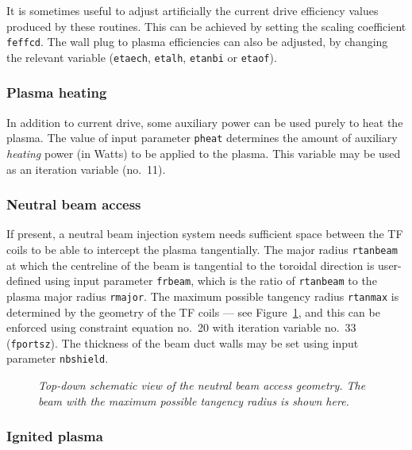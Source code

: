 \documentclass[11pt,a4paper]{report}
\begin{document}
It is sometimes useful to adjust artificially the current drive efficiency
values produced by these routines. This can be achieved by setting the scaling
coefficient \texttt{feffcd}. The wall plug to plasma efficiencies can also be
adjusted, by changing the relevant variable (\texttt{etaech}, \texttt{etalh},
\texttt{etanbi} or \texttt{etaof}).

\subsubsection{Plasma heating}

In addition to current drive, some auxiliary power can be used purely to heat
the plasma. The value of input parameter \texttt{pheat} determines the amount
of auxiliary \textit{heating}\/ power (in Watts) to be applied to the
plasma. This variable may be used as an iteration variable (no.\ 11).

\subsubsection{Neutral beam access}

If present, a neutral beam injection system needs sufficient space between the
TF coils to be able to intercept the plasma tangentially. The major radius
\texttt{rtanbeam} at which the centreline of the beam is tangential to the
toroidal direction is user-defined using input parameter \texttt{frbeam},
which is the ratio of \texttt{rtanbeam} to the plasma major radius
\texttt{rmajor}. The maximum possible tangency radius \texttt{rtanmax} is
determined by the geometry of the TF coils --- see Figure~\ref{fig:portsize},
and this can be enforced using constraint equation no.\ 20 with iteration
variable no.\ 33 (\texttt{fportsz}). The thickness of the beam duct walls may
be set using input parameter \texttt{nbshield}.

\begin{figure}[tbph]
\caption[Schematic diagram of the neutral beam access geometry]
{\label{fig:portsize}
  \textit{Top-down schematic view of the neutral beam access geometry. The beam
    with the maximum possible tangency radius is shown here.}
}
\end{figure}

\subsubsection{Ignited plasma}
\label{sec:ignited}
\end{document}
